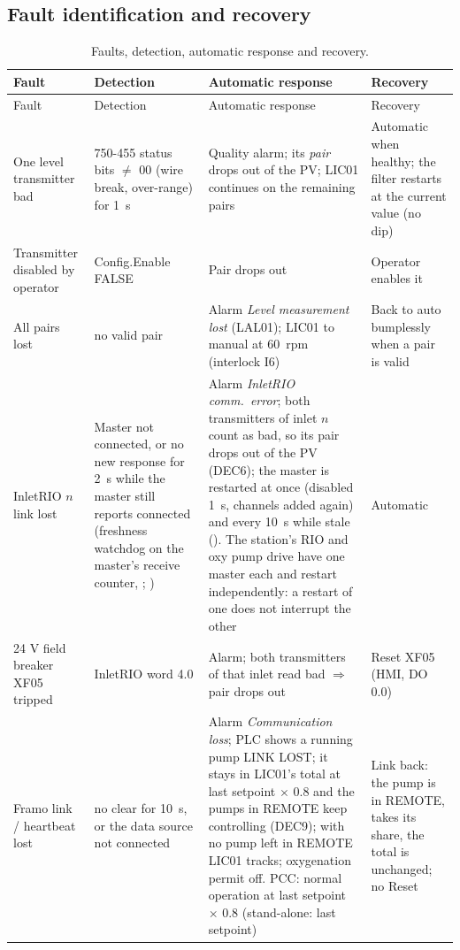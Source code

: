 \documentclass[11pt,a4paper]{article}
\begin{document}
\subsection{Fault identification and recovery}
\label{sec:faults}
\begin{small}
\begin{longtable}{@{}P{30mm}P{34mm}P{50mm}P{38mm}@{}}
\caption{Faults, detection, automatic response and recovery.}\label{tab:faults}\\
\toprule
Fault & Detection & Automatic response & Recovery \\
\midrule
\endfirsthead
\toprule
Fault & Detection & Automatic response & Recovery \\
\midrule
\endhead
\bottomrule
\endfoot
One level transmitter bad & 750-455 status bits $\neq$ 00 (wire break, over-range) for 1~s & Quality alarm; its \emph{pair} drops out of the PV; LIC01 continues on the remaining pairs & Automatic when healthy; the filter restarts at the current value (no dip) \\
Transmitter disabled by operator & Config.Enable FALSE & Pair drops out & Operator enables it \\
All pairs lost & no valid pair & Alarm \emph{Level measurement lost} (LAL01); LIC01 to manual at  60~rpm (interlock I6) & Back to auto bumplessly when a pair is valid \\
InletRIO $n$ link lost & Master not connected, or no new response for 2~s while the master still reports connected (freshness watchdog on the master's receive counter, ; ) & Alarm \emph{InletRIO comm.\ error}; both transmitters of inlet $n$ count as bad, so its pair drops out of the PV (DEC6); the master is restarted at once (disabled 1~s, channels added again) and every 10~s while stale (). The station's RIO and oxy pump drive have one master each and restart independently: a restart of one does not interrupt the other & Automatic \\
24 V field breaker XF05 tripped & InletRIO word 4.0 & Alarm; both transmitters of that inlet read bad $\Rightarrow$ pair drops out & Reset XF05 (HMI, DO 0.0) \\
Framo link / heartbeat lost & no clear for 10~s, or the data source  not connected & Alarm \emph{Communication loss}; PLC shows a running pump LINK LOST; it stays in LIC01's total at last setpoint $\times$ 0.8 and the pumps in REMOTE keep controlling (DEC9); with no pump left in REMOTE LIC01 tracks; oxygenation permit off. PCC: normal operation at last setpoint $\times$ 0.8 (stand-alone: last setpoint) & Link back: the pump is in REMOTE, takes its share, the total is unchanged; no Reset \\

\end{longtable}
\end{small}
\end{document}
